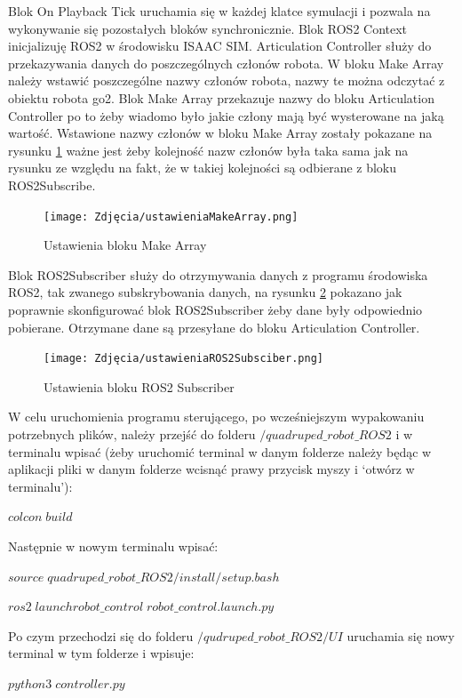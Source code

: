 \documentclass[12pt]{article}
\begin{document}
Blok On Playback Tick uruchamia się w każdej klatce symulacji i pozwala na wykonywanie się pozostałych bloków synchronicznie. Blok ROS2 Context inicjalizuję ROS2 w środowisku ISAAC SIM. Articulation Controller służy do przekazywania danych do poszczególnych członów robota. W bloku Make Array należy wstawić poszczególne nazwy członów robota, nazwy te można odczytać z obiektu robota go2. Blok Make Array przekazuje nazwy do bloku Articulation Controller po to żeby wiadomo było jakie człony mają być wysterowane na jaką wartość. Wstawione nazwy członów w bloku Make Array zostały pokazane na rysunku \ref{fig:makeArray} ważne jest żeby kolejność nazw członów była taka sama jak na rysunku ze względu na fakt, że w takiej kolejności są odbierane z bloku ROS2Subscribe.


\begin{figure}[h]
    \centering
    \texttt{[image: Zdjęcia/ustawieniaMakeArray.png]}
    \caption{Ustawienia bloku Make Array}
    \label{fig:makeArray}
\end{figure}

Blok ROS2Subscriber służy do otrzymywania danych z programu środowiska ROS2, tak zwanego subskrybowania danych, na rysunku \ref{fig:subscriberROS2} pokazano jak poprawnie skonfigurować blok ROS2Subscriber żeby dane były odpowiednio pobierane. Otrzymane dane są przesyłane do bloku Articulation Controller.

\begin{figure}[h]
    \centering
    \texttt{[image: Zdjęcia/ustawieniaROS2Subsciber.png]}
    \caption{Ustawienia bloku ROS2 Subscriber}
    \label{fig:subscriberROS2}
\end{figure}

W celu uruchomienia programu sterującego, po wcześniejszym wypakowaniu potrzebnych plików,  należy przejść do folderu $/quadruped\_robot\_ROS2$ i w terminalu wpisać (żeby uruchomić terminal w danym folderze należy będąc w aplikacji pliki w danym folderze wcisnąć prawy przycisk myszy i ‘otwórz w terminalu’):

$colcon\; build$

Następnie w nowym terminalu wpisać:


$source\; quadruped\_robot\_ROS2/install/setup.bash$

$ros2\; launch robot\_control\; robot\_control.launch.py$

Po czym przechodzi się do folderu $/qudruped\_robot\_ROS2/UI$ uruchamia się nowy terminal w tym folderze i wpisuje:

$python3\; controller.py$
\end{document}
